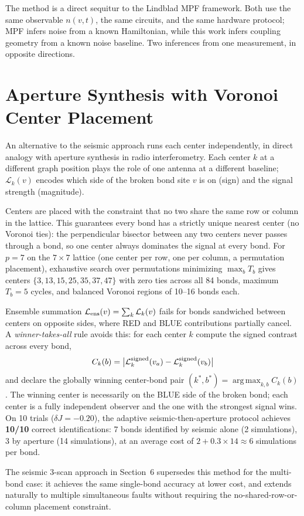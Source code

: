 \documentclass[11pt]{article}
\DeclareMathOperator*{\argmax}{arg\,max}
\begin{document}
The method is a direct sequitur to the Lindblad MPF framework. Both use the
same observable $n(v,t)$, the same circuits, and the same hardware protocol;
MPF infers noise from a known Hamiltonian, while this work infers coupling
geometry from a known noise baseline. Two inferences from one measurement,
in opposite directions.




\appendix

\section{Aperture Synthesis with Voronoi Center Placement}
\label{app:voronoi}

An alternative to the seismic approach runs each center independently, in
direct analogy with aperture synthesis in radio interferometry. Each center
$k$ at a different graph position plays the role of one antenna at a different
baseline; $\mathcal{L}_k(v)$ encodes which side of the broken bond site $v$
is on (sign) and the signal strength (magnitude).

Centers are placed with the constraint that no two share the same row or
column in the lattice. This guarantees every bond has a strictly unique nearest
center (no Voronoi ties): the perpendicular bisector between any two centers
never passes through a bond, so one center always dominates the signal at every
bond. For $p=7$ on the $7\times7$ lattice (one center per row, one per column,
a permutation placement), exhaustive search over permutations minimizing
$\max_b T_b$ gives centers $\{3,13,15,25,35,37,47\}$ with zero ties across
all 84 bonds, maximum $T_b = 5$ cycles, and balanced Voronoi regions of
10--16 bonds each.

Ensemble summation $\mathcal{L}_{\rm ens}(v) = \sum_k \mathcal{L}_k(v)$ fails
for bonds sandwiched between centers on opposite sides, where RED and BLUE
contributions partially cancel. A \emph{winner-takes-all} rule avoids this:
for each center $k$ compute the signed contrast across every bond,
\begin{equation}
    C_k(b) = \bigl|\mathcal{L}_k^{\rm signed}(v_a) - \mathcal{L}_k^{\rm signed}(v_b)\bigr|
\end{equation}
and declare the globally winning center-bond pair
$(k^*, b^*) = \argmax_{k,b} C_k(b)$.
The winning center is necessarily on the BLUE side of the broken bond; each
center is a fully independent observer and the one with the strongest signal wins.
On 10 trials ($\delta J = -0.20$), the adaptive seismic-then-aperture protocol
achieves \textbf{10/10} correct identifications: 7 bonds identified by seismic
alone (2 simulations), 3 by aperture (14 simulations), at an average cost of
$2 + 0.3 \times 14 \approx 6$ simulations per bond.

The seismic 3-scan approach in Section~6 supersedes this method for the
multi-bond case: it achieves the same single-bond accuracy at lower cost,
and extends naturally to multiple simultaneous faults without requiring
the no-shared-row-or-column placement constraint.
\end{document}
